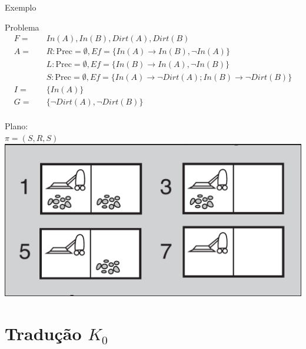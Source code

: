 \begin{frame}{Exemplo}
     \begin{block}{Problema}
        \begin{align*}
                F = \quad  & In(A),In(B),Dirt(A),Dirt(B) \\
                A = \quad  & R: \text{Prec} = \emptyset, Ef= \{ In(A) \rightarrow In(B),\lnot In(A) \} \\
                           & L: \text{Prec} = \emptyset, Ef= \{ In(B) \rightarrow In(A),\lnot In(B) \} \\
                           & S: \text{Prec} = \emptyset, Ef= \{ In(A)  \rightarrow \lnot Dirt(A); In(B) \rightarrow \lnot Dirt(B) \} \\
                I = \quad  & \{ In(A)\} \\
                G = \quad  & \{ \lnot Dirt(A),\lnot Dirt(B)  \} \\
        \end{align*}
    \end{block}
    
        \begin{multicols}{2}
            \centering
             Plano: \\$\pi = (S,R,S)$\\
        \columnbreak
            \includegraphics[scale=0.13 ]{images/belief_state0.png}
        
        \end{multicols}
    
\end{frame}





\section{Tradução $K_0$}

